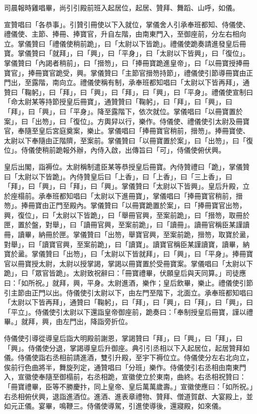 \begin{pinyinscope}
 司晨報時雞唱畢，尚引引殿前班入起居位，起居、贊拜、舞蹈、山呼，如儀。



 宣贊唱曰「各恭事」。引贊引冊使以下入就位，掌儀舍人引承奉班都知、侍儀使、禮儀使、主節、捧冊、捧寶官，升自左階，由南東門入，至御座前，分左右相向立。掌儀贊曰「禮儀使稍前跪」，曰「太尉以下皆跪」。禮儀使跪奏請進發皇后冊寶。掌儀贊曰「就拜」，曰「興」，曰「平身」，曰「太尉以下皆興」，曰「復位」。掌儀贊曰「內謁者稍前」，曰「搢笏」，曰「捧冊寶跪進皇帝」，曰「以冊寶授捧冊寶官」，捧冊寶官跪受，興。掌儀贊曰「主節官搢笏持節」，禮儀使引節導冊寶由正門出，至露階，南向立。禮儀使稱有制，承奉班都知唱曰「太尉以下皆再拜」，通贊曰「鞠躬」，曰「拜」，曰「興」，曰「拜」，曰「興」，曰「平身」。禮儀使宣制曰「命太尉某等持節授皇后冊寶」，通贊贊曰「鞠躬」，曰「拜」，曰「興」，曰「拜」，曰「興」，曰「平身」。降至露階下，依次就位。掌儀唱曰「以冊寶置於案」，曰「出笏」，曰「復位」。方輿舁以行，樂作。侍儀使、禮儀使引太尉及冊寶官，奉隨至皇后宮庭奠案，樂止。掌儀唱曰「捧冊寶官稍前，搢笏」。捧冊寶使、太尉以下奉隨由正階隮，至案前。掌儀贊曰「以冊寶置於案」，曰「出笏」，曰「復位」。侍儀使稍前跪報外辦，內侍入啟，出傳旨曰「可」，侍儀使俯伏興。



 皇后出閣，詣褥位。太尉稱制遣臣某等恭授皇后冊寶。內侍贊禮曰「跪」，掌儀贊曰「太尉以下皆跪」。內侍贊皇后曰「上香」，曰「上香」，曰「三上香」，曰「拜」，曰「興」，曰「拜」，曰「興」。掌儀贊曰「太尉以下皆興」。皇后升殿，立於座榻前。承奉班都知唱曰「太尉以下進冊寶」，掌儀唱曰「捧冊寶官稍前，搢笏」。捧冊寶由正門至殿內。掌儀贊曰「以冊寶跪置於案」，曰「捧冊寶官出笏，興，復位」，曰「太尉以下皆跪」，曰「舉冊官興，至案前跪」，曰「搢笏，取冊於匣，置於盤，對舉」，曰「讀冊官興，至案前跪」，曰「讀冊」。讀冊官稱臣某謹讀冊，讀畢，納冊於匣。掌儀贊曰「出笏，舉寶官興，至案前跪，搢笏，取寶於盝，對舉」，曰「讀寶官興，至案前跪」，曰「讀寶」。讀寶官稱臣某謹讀寶，讀畢，納寶於盝。掌儀贊曰「出笏」，曰「太尉以下皆就拜」，曰「興」，曰「平身」。捧冊寶官以冊寶授太尉，太尉以授掌謁，掌謁以冊寶置於受冊寶案。掌儀唱曰「太尉以下跪」，曰「眾官皆跪」。太尉致祝辭曰：「冊寶禮畢，伏願皇后與天同算。」司徒應曰：「如所祝。」就拜，興，平身。太尉進酒，樂作；皇后飲畢，樂止。禮儀使引節引主節由正門以出。侍儀使引太尉以下，由左門至階下，北面立。承奉班都知唱曰「太尉以下皆再拜」，通贊曰「鞠躬」，曰「拜」，曰「興」，曰「拜」，曰「興」，曰「平立」。侍儀使引太尉以下還詣皇帝御座前，跪奏曰：「奉制授皇后冊寶，謹以禮畢。」就拜，興，由左門出，降詣旁折位。



 侍儀使引導從導皇后詣大明殿前謝恩，掌謁贊曰「拜」，曰「興」，曰「拜」，曰「興」。侍儀使分退，掌謁導皇后升御座。典引引丞相以下入起居位，起居贊拜如儀。侍儀使詣右丞相前請進酒，雙引升殿，至宇下褥位立。侍儀使分左右北向立，俟前行色曲將半，舞旋列定，通贊唱曰「分班」樂作。侍儀使引右丞相由南東門入，宣徽使奉隨至御榻前，右丞相跪，宣徽使立於東南，曲終。右丞相祝贊曰：「冊寶禮畢，臣等不勝慶抃，同上皇帝、皇后萬萬歲壽。」宣徽使應曰：「如所祝。」右丞相俯伏興，退詣進酒位。進酒、進表章禮物、贊拜、僧道賀獻、大宴殿上，並如元正儀。宴畢，鳴鞭三。侍儀使導駕，引進使導後，還寢殿，如來儀。




\end{pinyinscope}
